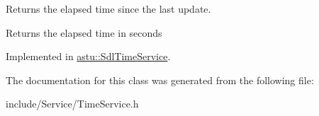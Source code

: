 Returns the elapsed time since the last update.

\begin{DoxyReturn}{Returns}
the elapsed time in seconds 
\end{DoxyReturn}


Implemented in \hyperlink{classastu_1_1SdlTimeService_a6652d19cae14e20ec85a1808fc8e87b7}{astu\+::\+Sdl\+Time\+Service}.



The documentation for this class was generated from the following file\+:\begin{DoxyCompactItemize}
\item 
include/\+Service/Time\+Service.\+h\end{DoxyCompactItemize}
